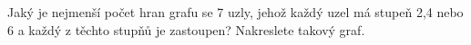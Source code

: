 \subsubsection{}
Jaký je nejmenší počet hran grafu se 7 uzly, jehož každý uzel má stupeň 2,4 nebo
6 a každý z těchto stupňů je zastoupen? Nakreslete takový graf.
